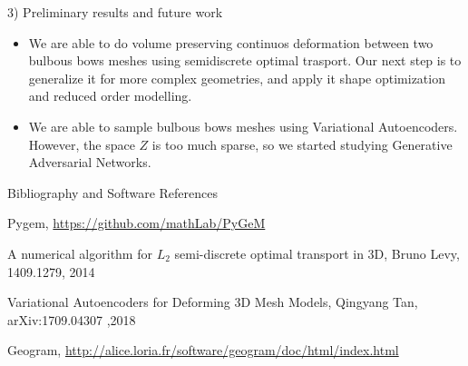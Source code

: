 \documentclass[b0paper,portrait]{baposter}
\begin{document}
\begin{poster}
\begin{posterbox}[name=results,below=vae,span=6,column=0]{3) Preliminary results and future work}

\begin{itemize}
 \setlength\itemsep{0.1em}
\item We are able to do volume preserving continuos deformation between two bulbous bows meshes using semidiscrete optimal trasport. Our next step is to generalize it for more complex geometries, and apply it shape optimization and reduced order modelling.
\item We are able to sample bulbous bows meshes using Variational Autoencoders. However, the space $Z$ is too much sparse, so we started studying Generative Adversarial Networks. 
\end{itemize}
\end{posterbox}
\begin{posterbox}[name=bibliography,below=results,span=6,column=0]{Bibliography and Software References}
\begingroup
\renewcommand{\section}[2]{}%
\begin{thebibliography}{9}
 \setlength\itemsep{0.1em}
Pygem, \url{https://github.com/mathLab/PyGeM}

A numerical algorithm for $L_{2}$ semi-discrete optimal transport in 3D, Bruno Levy, 1409.1279, 2014

Variational Autoencoders for Deforming 3D Mesh Models, Qingyang Tan, arXiv:1709.04307 ,2018

Geogram, \url{http://alice.loria.fr/software/geogram/doc/html/index.html}
\end{thebibliography}
\endgroup
\end{posterbox}

\end{poster}
\end{document}
